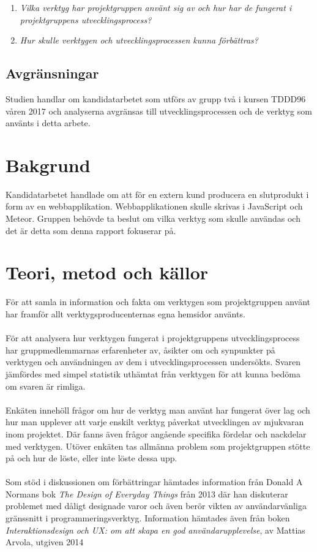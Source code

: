 \begin{enumerate}
\item \textit{Vilka verktyg har projektgruppen använt sig av och hur har de fungerat i projektgruppens utvecklingsprocess?}
\item \textit{Hur skulle verktygen och utvecklingsprocessen kunna förbättras?}
\end{enumerate}

\subsection{Avgränsningar}
\label{sec:jonathan-delimitations}
Studien handlar om kandidatarbetet som utförs av grupp två i kursen TDDD96 våren 2017 och analyserna avgränsas till utvecklingsprocessen och de verktyg som använts i detta arbete.

\section{Bakgrund}
\label{cha:jonathan-bakgrund}
Kandidatarbetet handlade om att för en extern kund producera en slutprodukt i form av en webbapplikation. Webbapplikationen skulle skrivas i JavaScript och Meteor. Gruppen behövde ta beslut om vilka verktyg som skulle användas och det är detta som denna rapport fokuserar på.

\section{Teori, metod och källor}
\label{cha:jonathan-theory}
För att samla in information och fakta om verktygen som projektgruppen använt har framför allt verktygsproducenternas egna hemsidor använts.
\\\\
För att analysera hur verktygen fungerat i projektgruppens utvecklingsprocess har gruppmedlemmarnas erfarenheter av, åsikter om och synpunkter på verktygen och användningen av dem i utvecklingsprocessen undersökts. Svaren jämfördes med simpel statistik uthämtat från verktygen för att kunna bedöma om svaren är rimliga.
\\\\
Enkäten innehöll frågor om hur de verktyg man använt har fungerat över lag och hur man upplever att varje enskilt verktyg påverkat utvecklingen av mjukvaran inom projektet. Där fanns även frågor angående specifika fördelar och nackdelar med verktygen. Utöver enkäten tas allmänna problem som projektgruppen stötte på och hur de löste, eller inte löste dessa upp.
\\\\
Som stöd i diskussionen om förbättringar hämtades information från Donald A Normans bok \textit{The Design of Everyday Things} från 2013 \cite{book:the-design-of-everyday-things} där han diskuterar problemet med dåligt designade varor och även berör vikten av användarvänliga gränssnitt i programmeringsverktyg. Information hämtades även från boken \textit{Interaktionsdesign och UX: om att skapa en god användarupplevelse}, av Mattias Arvola, utgiven 2014  \cite{arvolaboken}

